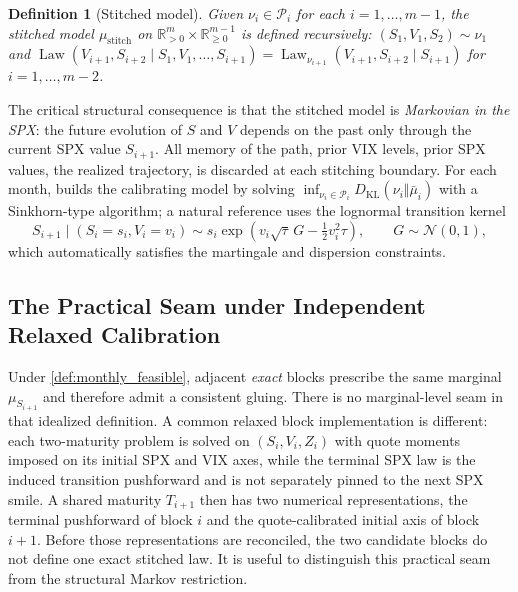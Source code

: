 \documentclass{article}
\newtheorem{definition}{Definition}[section]
\DeclareMathOperator{\Law}{Law}
\newcommand{\cP}{\mathcal{P}}
\begin{document}
\begin{definition}[Stitched model]\label{def:stitched}
Given $\nu_i \in \cP_i$ for each $i = 1, \ldots, m-1$, the stitched model $\mu_{\mathrm{stitch}}$ on $\mathbb{R}_{>0}^{m} \times \mathbb{R}_{\geq 0}^{m-1}$ is defined recursively: $(S_1, V_1, S_2) \sim \nu_1$ and $\Law(V_{i+1}, S_{i+2} \mid S_1, V_1, \ldots, S_{i+1}) = \Law_{\nu_{i+1}}(V_{i+1}, S_{i+2} \mid S_{i+1})$ for $i = 1, \ldots, m-2$.
\end{definition}

The critical structural consequence is that the stitched model is \emph{Markovian in the SPX}: the future evolution of $S$ and $V$ depends on the past only through the current SPX value $S_{i+1}$.
All memory of the path, prior VIX levels, prior SPX values, the realized trajectory, is discarded at each stitching boundary.
For each month, \citeauthor{guyon2020joint} builds the calibrating model by solving $\inf_{\nu_i \in \cP_i}D_{\mathrm{KL}}(\nu_i\Vert\bar{\mu}_i)$ with a Sinkhorn-type algorithm; a natural reference uses the lognormal transition kernel
\begin{equation}\label{eq:lognormal_kernel}
    S_{i+1} \mid (S_i = s_i, V_i = v_i) \sim s_i \exp\!\left(v_i\sqrt{\tau}\,G - \tfrac{1}{2}v_i^2\tau\right), \qquad G \sim \mathcal{N}(0,1),
\end{equation}
which automatically satisfies the martingale and dispersion constraints.

\subsection{The Practical Seam under Independent Relaxed Calibration}\label{subsec:seam}

Under \cref{def:monthly_feasible}, adjacent \emph{exact} blocks prescribe the same marginal $\mu_{S_{i+1}}$ and therefore admit a consistent gluing.
There is no marginal-level seam in that idealized definition.
A common relaxed block implementation is different: each two-maturity problem is solved on $(S_i,V_i,Z_i)$ with quote moments imposed on its initial SPX and VIX axes, while the terminal SPX law is the induced transition pushforward and is not separately pinned to the next SPX smile.
A shared maturity $T_{i+1}$ then has two numerical representations, the terminal pushforward of block $i$ and the quote-calibrated initial axis of block $i+1$.
Before those representations are reconciled, the two candidate blocks do not define one exact stitched law.
It is useful to distinguish this practical seam from the structural Markov restriction.
\end{document}
